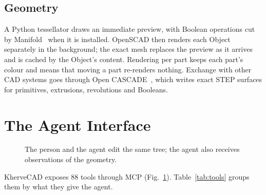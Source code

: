 \documentclass[lineno]{asmejour}
\begin{document}
\subsection{Geometry}
A Python tessellator draws an immediate preview, with Boolean operations cut by Manifold~\cite{manifold} when it is installed. OpenSCAD then renders each Object separately in the background; the exact mesh replaces the preview as it arrives and is cached by the Object's content. Rendering per part keeps each part's colour and means that moving a part re-renders nothing. Exchange with other CAD systems goes through Open CASCADE~\cite{occt}, which writes exact STEP surfaces for primitives, extrusions, revolutions and Booleans.

\section{The Agent Interface}

\begin{figure}[t]
\centering
{}
\caption{The person and the agent edit the same tree; the agent also receives observations of the geometry.}
\label{fig:arch}
\end{figure}

KherveCAD exposes 88 tools through MCP (Fig.~\ref{fig:arch}). Table~\ref{tab:tools} groups them by what they give the agent.
\end{document}
